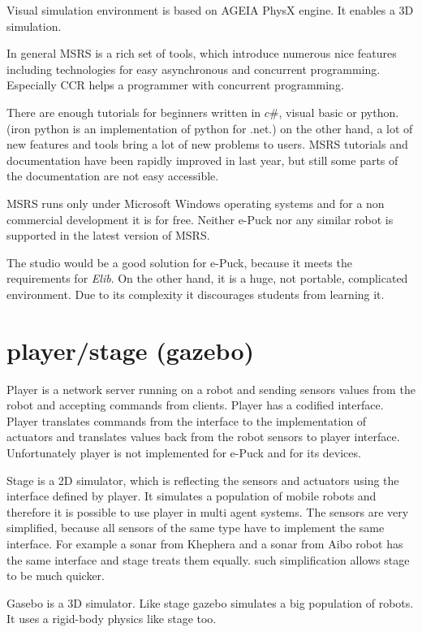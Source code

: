   Visual simulation environment is based on AGEIA PhysX engine. It enables a 3D simulation.
  
  In general MSRS is a rich set of tools, which introduce numerous nice features including
  technologies for easy asynchronous and concurrent programming. Especially CCR helps
  a programmer with concurrent programming. 
  
  There are enough tutorials for beginners written
  in $c\#$, visual basic or python. (iron python is an implementation of python for .net.)
  on the other hand, a lot of new features and tools bring a lot of new problems to users.
  MSRS tutorials and documentation have been rapidly improved in last year, but still some parts
  of the documentation are not easy accessible.
  
  MSRS runs only under Microsoft Windows operating systems and for a non commercial development
  it is for free. Neither e-Puck nor any similar robot is supported in the latest version of MSRS.
  
  The studio would be a good solution for e-Puck, because it meets the requirements for {\it Elib}.
  On the other hand, it is a huge, not portable, complicated environment.
  Due to its complexity it discourages students from learning it.
\section{player/stage (gazebo) }
  Player\cite{player} is a network server running on a robot and sending sensors values from the robot and
  accepting commands from clients. Player\cite{player} has a codified interface. Player\cite{player} translates
  commands from the interface to the implementation of actuators and translates values back from the robot sensors 
  to player\cite{player} interface. Unfortunately player\cite{player} is not implemented for e-Puck
  and for its devices.
  
  Stage is a 2D simulator, which is reflecting the sensors and actuators using the interface defined by player.
  It simulates a population of mobile robots and therefore it is possible to use player 
  in multi agent systems.
  The sensors are very simplified, because all sensors of the same type 
  have to implement the same interface. For example a sonar from Khephera and a sonar from Aibo robot
  has the same interface and stage treats them equally. 
  such simplification allows stage to be much quicker.
  
  Gasebo\cite{player} is a 3D simulator. Like stage gazebo simulates a big population of robots.
  It uses a rigid-body physics like stage too.
  
